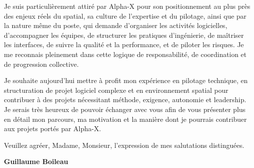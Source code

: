 \documentclass[11pt,a4paper]{altacv}
\begin{document}
{Je suis particulièrement attiré par Alpha-X pour son positionnement au plus près des enjeux réels du spatial, sa culture de l'expertise et du pilotage, ainsi que par la nature même du poste, qui demande d'organiser les activités logicielles, d'accompagner les équipes, de structurer les pratiques d'ingénierie, de maîtriser les interfaces, de suivre la qualité et la performance, et de piloter les risques. Je me reconnais pleinement dans cette logique de responsabilité, de coordination et de progression collective.

Je souhaite aujourd'hui mettre à profit mon expérience en pilotage technique, en structuration de projet logiciel complexe et en environnement spatial pour contribuer à des projets nécessitant méthode, exigence, autonomie et leadership. Je serais très heureux de pouvoir échanger avec vous afin de vous présenter plus en détail mon parcours, ma motivation et la manière dont je pourrais contribuer aux projets portés par Alpha-X.

Veuillez agréer, Madame, Monsieur, l'expression de mes salutations distinguées.

\textbf{Guillaume Boileau}

}
\end{document}
